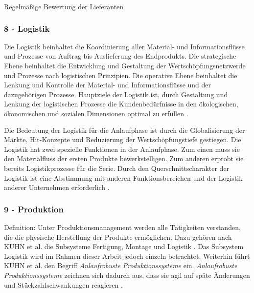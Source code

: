 Regelmäßige Bewertung der Lieferanten



% 
% 
% 
% 

\subsubsection*{8 - Logistik}

Die Logistik beinhaltet die Koordinierung aller Material- und Informationsflüsse und Prozesse von Auftrag bis Auslieferung des Endprodukts. Die strategische Ebene beinhaltet die Entwicklung und Gestaltung der Wertschöpfungsnetzwerde und Prozesse nach logistischen Prinzipien. Die operative Ebene beinhaltet die Lenkung und Kontrolle der Material- und Informationsflüsse und der dazugehörigen Prozesse. 
Hauptziele der Logistik ist, durch Gestaltung und Lenkung der logistischen Prozesse die Kundenbedürfnisse in den ökologischen, ökonomischen und sozialen Dimensionen optimal zu erfüllen \cite[28]{Schmitt2015}. 

Die Bedeutung der Logistik für die Anlaufphase ist durch die Globalisierung der Märkte, Hit-Konzepte und Reduzierung der Wertschöpfungstiefe gestiegen. Die Logistik hat zwei spezielle Funktionen in der Anlaufphase. Zum einen muss sie den Materialfluss der ersten Produkte bewerkstelligen. Zum anderen erprobt sie bereits Logistikprozesse für die Serie.
Durch den Querschnittscharakter der Logistik ist eine Abstimmung mit anderen Funktionsbereichen und der Logistik anderer Unternehmen erforderlich \cite[1189]{Pfohl2000}.


\subsubsection*{9 - Produktion}
Definition: 
Unter Produktionsmanagement werden alle Tätigkeiten verstanden, die die physische Herstellung der Produkte ermöglichen. Dazu gehören nach KUHN et al. die Subsysteme Fertigung, Montage und Logistik \cite{Kuhn2002}. Das Subsystem Logistik wird im Rahmen dieser Arbeit jedoch einzeln betrachtet. Weiterhin führt KUHN et al. den Begriff \textit{Anlaufrobuste Produktionssysteme} ein. \textit{Anlaufrobuste Produktionssysteme} zeichnen sich dadurch aus, dass sie agil auf späte Änderungen und Stückzahlschwankungen reagieren \cite[20]{Bischoff2007}. 

